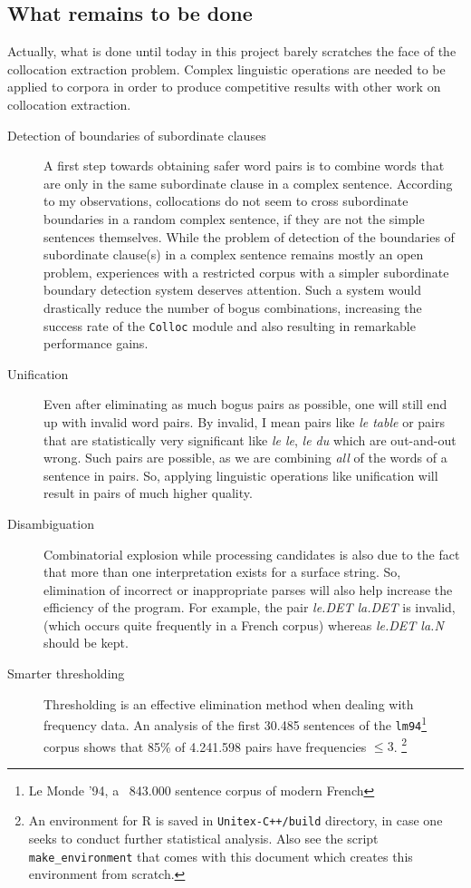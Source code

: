 \documentclass[a4paper,12pt,oneside]{article}
\begin{document}
\subsection{What remains to be done}
Actually, what is done until today in this project barely scratches the face of the collocation extraction problem. Complex linguistic operations are needed to be applied to corpora in order to produce competitive results with other work on collocation extraction.

\begin{description}
\item[Detection of boundaries of subordinate clauses]
	A first step towards obtaining safer word pairs is to combine words that are only in the same subordinate clause in a complex sentence. According to my observations, collocations do not seem to cross subordinate boundaries in a random complex sentence, if they are not the simple sentences themselves. While the problem of detection of the boundaries of subordinate clause(s) in a complex sentence remains mostly an open problem, experiences with a restricted corpus with a simpler subordinate boundary detection system deserves attention. Such a system would drastically reduce the number of bogus combinations, increasing the success rate of the \texttt{Colloc} module and also resulting in remarkable performance gains.

\item[Unification]
	Even after eliminating as much bogus pairs as possible, one will still end up with invalid word pairs. By invalid, I mean pairs like \emph{le table} or pairs that are statistically very significant like \emph{le le}, \emph{le du} which are out-and-out wrong. Such pairs are possible, as we are combining \emph{all} of the words of a sentence in pairs. So, applying linguistic operations like unification will result in pairs of much higher quality.

\item[Disambiguation]
	Combinatorial explosion while processing candidates is also due to the fact that more than one interpretation exists for a surface string. So, elimination of incorrect or inappropriate parses will also help increase the efficiency of the program. For example, the pair \emph{le.DET la.DET} is invalid, (which occurs quite frequently in a French corpus) whereas \emph{le.DET la.N} should be kept.

\item[Smarter thresholding]
	Thresholding is an effective elimination method when dealing with frequency data. An analysis of the first 30.485 sentences of the \texttt{lm94}\footnote{Le Monde '94, a ~843.000 sentence corpus of modern French} corpus shows that 85\% of 4.241.598 pairs have frequencies $\leq 3$. \footnote{An environment for R\cite{RProject} is saved in \texttt{Unitex-C++/build} directory, in case one seeks to conduct further statistical analysis. Also see the script \texttt{make\_environment} that comes with this document which creates this environment from scratch.}


\end{description}
\end{document}

